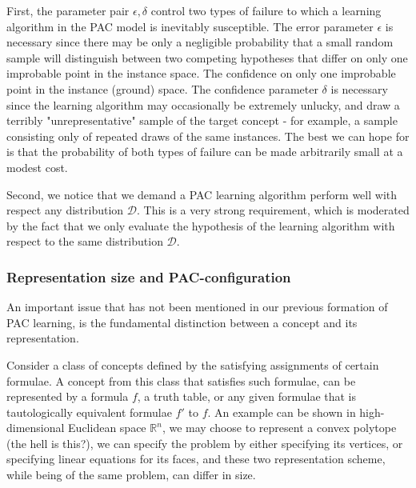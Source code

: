First, the parameter pair $\epsilon, \delta$ control two types of failure to which a learning algorithm in the PAC model is inevitably susceptible. The error parameter $\epsilon$ is necessary since there may be only a negligible probability that a small random sample will distinguish between two competing hypotheses that differ on only one improbable point in the instance space. The confidence on only one improbable point in the instance (ground) space. The confidence parameter $\delta$ is necessary since the learning algorithm may occasionally be extremely unlucky, and draw a terribly "unrepresentative" sample of the target concept - for example, a sample consisting only of repeated draws of the same instances. The best we can hope for is that the probability of both types of failure can be made arbitrarily small at a modest cost. 

Second, we notice that we demand a PAC learning algorithm perform well with respect any distribution $\mathcal{D}$. This is a very strong requirement, which is moderated by the fact that we only evaluate the hypothesis of the learning algorithm with respect to the same distribution $\mathcal{D}$. 

\subsubsection{Representation size and PAC-configuration}

An important issue that has not been mentioned in our previous formation of PAC learning, is the fundamental distinction between a concept and its representation. 

Consider a class of concepts defined by the satisfying assignments of certain formulae. A concept from this class that satisfies such formulae, can be represented by a formula $f$, a truth table, or any given formulae that is tautologically equivalent formulae $f'$ to $f$. An example can be shown in high-dimensional Euclidean space $\mathbb{R}^n$, we may choose to represent a convex polytope (the hell is this?), we can specify the problem by either specifying its vertices, or specifying linear equations for its faces, and these two representation scheme, while being of the same problem, can differ in size. 

